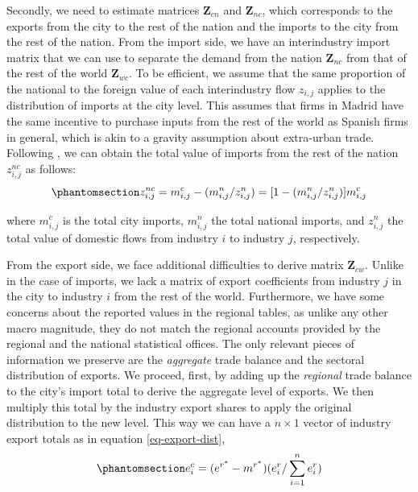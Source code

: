 \documentclass[
  10pt,
  twocolumn]{aft}
\begin{document}
Secondly, we need to estimate matrices \(\textbf{Z}_{cn}\) and
\(\textbf{Z}_{nc}\), which corresponds to the exports from the city to
the rest of the nation and the imports to the city from the rest of the
nation. From the import side, we have an interindustry import matrix
that we can use to separate the demand from the nation
\(\textbf{Z}_{nc}\) from that of the rest of the world
\(\textbf{Z}_{wc}\). To be efficient, we assume that the same proportion
of the national to the foreign value of each interindustry flow
\(z_{i,j}\) applies to the distribution of imports at the city level.
This assumes that firms in Madrid have the same incentive to purchase
inputs from the rest of the world as Spanish firms in general, which is
akin to a gravity assumption about extra-urban trade. Following
\citet[p.~475]{miller_input-output_2022}, we can obtain the total value
of imports from the rest of the nation \(z^{nc}_{i,j}\) as follows:
\vspace{-1.5pt}
\begin{equation}\phantomsection\label{eq-import-dist}{ z^{nc}_{i,j} = m^c_{i,j} - (m^n_{i,j}/z^n_{i,j}) = [1 - (m^n_{i,j}/z^n_{i,j})]m^c_{i,j}}\end{equation}

where \(m^c_{i,j}\) is the total city imports, \(m^n_{i,j}\) the total
national imports, and \(z^n_{i,j}\) the total value of domestic flows
from industry \(i\) to industry \(j\), respectively.

From the export side, we face additional difficulties to derive matrix
\(\textbf{Z}_{cw}\). Unlike in the case of imports, we lack a matrix of
export coefficients from industry \(j\) in the city to industry \(i\)
from the rest of the world. Furthermore, we have some concerns about the
reported values in the regional tables, as unlike any other macro
magnitude, they do not match the regional accounts provided by the
regional and the national statistical offices. The only relevant pieces
of information we preserve are the \emph{aggregate} trade balance and
the sectoral distribution of exports. We proceed, first, by adding up
the \emph{regional} trade balance to the city's import total to derive
the aggregate level of exports. We then multiply this total by the
industry export shares to apply the original distribution to the new
level. This way we can have a \(n \times 1\) vector of industry export
totals as in equation \ref{eq-export-dist}, \vspace{-3pt}
\begin{equation}\phantomsection\label{eq-export-dist}{ e^{c}_{i} = (e^{r^\ast} - m^{r^\ast})(e^r_{i}/\sum^n_{i=1}e^r_{i}) }\end{equation}
\end{document}
